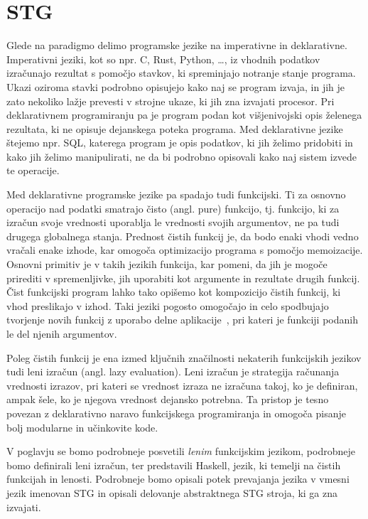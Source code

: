 \chapter{STG}
\label{ch:stg}

Glede na paradigmo delimo programske jezike na imperativne in deklarativne. Imperativni jeziki, kot so npr. C, Rust, Python, \dots, iz vhodnih podatkov izračunajo rezultat s pomočjo stavkov, ki spreminjajo notranje stanje programa. Ukazi oziroma stavki podrobno opisujejo kako naj se program izvaja, in jih je zato nekoliko lažje prevesti v strojne ukaze, ki jih zna izvajati procesor. Pri deklarativnem programiranju pa je program podan kot višjenivojski opis želenega rezultata, ki ne opisuje dejanskega poteka programa. Med deklarativne jezike štejemo npr. SQL, katerega program je opis podatkov, ki jih želimo pridobiti in kako jih želimo manipulirati, ne da bi podrobno opisovali kako naj sistem izvede te operacije.

Med deklarativne programske jezike pa spadajo tudi funkcijski. Ti za osnovno operacijo nad podatki smatrajo čisto (angl. pure) funkcijo, tj. funkcijo, ki za izračun svoje vrednosti uporablja le vrednosti svojih argumentov, ne pa tudi drugega globalnega stanja. Prednost čistih funkcij je, da bodo enaki vhodi vedno vračali enake izhode, kar omogoča optimizacijo programa s pomočjo memoizacije. Osnovni primitiv je v takih jezikih funkcija, kar pomeni, da jih je mogoče prirediti v spremenljivke, jih uporabiti kot argumente in rezultate drugih funkcij. Čist funkcijski program lahko tako opišemo kot kompozicijo čistih funkcij, ki vhod preslikajo v izhod. Taki jeziki pogosto omogočajo in celo spodbujajo tvorjenje novih funkcij z uporabo delne aplikacije~\cite{10.1145/72551.72554}, pri kateri je funkciji podanih le del njenih argumentov.

Poleg čistih funkcij je ena izmed ključnih značilnosti nekaterih funkcijskih jezikov tudi leni izračun (angl. lazy evaluation). Leni izračun je strategija računanja vrednosti izrazov, pri kateri se vrednost izraza ne izračuna takoj, ko je definiran, ampak šele, ko je njegova vrednost dejansko potrebna. Ta pristop je tesno povezan z deklarativno naravo funkcijskega programiranja in omogoča pisanje bolj modularne in učinkovite kode.

V poglavju se bomo podrobneje posvetili \textit{lenim} funkcijskim jezikom, podrobneje bomo definirali leni izračun, ter predstavili Haskell, jezik, ki temelji na čistih funkcijah in lenosti. Podrobneje bomo opisali potek prevajanja jezika v vmesni jezik imenovan STG in opisali delovanje abstraktnega STG stroja, ki ga zna izvajati.

